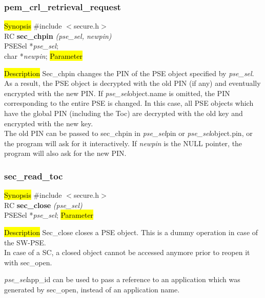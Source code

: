 \subsubsection{pem\_crl\_retrieval\_request}
\label{sec_chpin}
\hl{Synopsis}
\#include $<$secure.h$>$ \\ [0.5cm]
RC {\bf sec\_chpin} {\em (pse\_sel, newpin)} \\
PSESel *{\em pse\_sel}; \\
char *{\em newpin};
\hl{Parameter}


\hl{Description}
Sec\_chpin changes the PIN of the PSE object specified by {\em pse\_sel}.
As a result, the PSE object is decrypted with the old PIN (if any) and eventually
encrypted with the new PIN.
If {\em pse\_sel}\pf object.name is omitted, the PIN corresponding to the entire
PSE is changed. In this case, all PSE objects which have the global PIN (including the
Toc) are decrypted with the old key and encrypted with the new key.\\
The old PIN can be passed to sec\_chpin in {\em pse\_sel}\pf pin or {\em pse\_sel}\pf object.pin,
or the program will ask for it interactively.
If {\em newpin} is the NULL pointer, the program will also ask for the new PIN.

\subsubsection{sec\_read\_toc}
\label{sec_close}
\hl{Synopsis}
\#include $<$secure.h$>$ \\ [0.5cm]
RC {\bf sec\_close} {\em (pse\_sel)} \\
PSESel *{\em pse\_sel};
\hl{Parameter}

\hl{Description}
Sec\_close closes a PSE object. This is a dummy operation in case of the SW-PSE. \\ [0.5cm]
In case of a SC, a closed object cannot be accessed anymore prior to reopen 
it with sec\_open. 

{\em pse\_sel}\pf app\_id can be used to pass a reference to an application which was generated
by sec\_open, instead of an application name.

